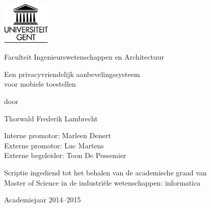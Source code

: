 

\begin{titlepage}

\setlength{\hoffset}{-1in}
\setlength{\voffset}{-1in}
\setlength{\topmargin}{1.5cm}
\setlength{\headheight}{0.5cm}
\setlength{\headsep}{1cm}
\setlength{\oddsidemargin}{3cm}
\setlength{\evensidemargin}{3cm}
\setlength{\footskip}{1.5cm}
\enlargethispage{1cm}

\fontsize{12pt}{14pt}
\selectfont

\begin{center}

\includegraphics[height=2cm]{fig/ruglogo}

\vspace{0.5cm}

Faculteit Ingenieurswetenschappen en Architectuur\\

\vspace{3.5cm}

\fontsize{17.28pt}{21pt}
\selectfont
Een privacyvriendelijk aanbevelingssysteem\\
voor mobiele toestellen
\fontsize{12pt}{14pt}
\selectfont

\vspace{.6cm}

door 

\vspace{.4cm}

Thorwald Frederik Lambrecht

\vspace{3.5cm}

Interne promotor: Marleen Denert\\
Externe promotor: Luc Martens
\\Externe begeleider: Toon De Pessemier

\vspace{2cm}

Scriptie ingediend tot het behalen van de academische graad van\\
Master of Science in de industri\"ele wetenschappen: informatica

\vspace{1cm}

Academiejaar 2014--2015

\end{center}
\end{titlepage}
